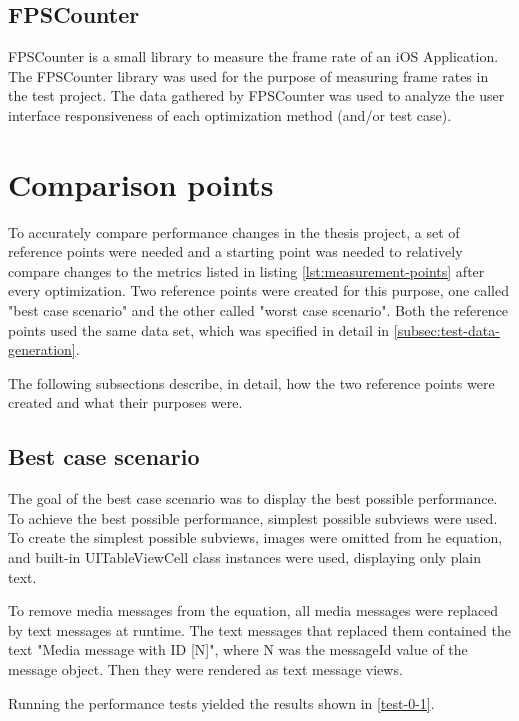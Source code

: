 \documentclass[a4paper,12pt]{article}
\begin{document}
\subsection{FPSCounter}
FPSCounter is a small library to measure the frame rate of an iOS Application.\cite{FPSCounterGithub} The FPSCounter library was used for the purpose of measuring frame rates in the test project. The data gathered by FPSCounter was used to analyze the user interface responsiveness of each optimization method (and/or test case).

\section{Comparison points}
To accurately compare performance changes in the thesis project, a set of reference points were needed and a starting point was needed to relatively compare changes to the metrics listed in listing \autoref{lst:measurement-points} after every optimization. Two reference points were created for this purpose, one called "best case scenario" and the other called "worst case scenario". Both the reference points used the same data set, which was specified in detail in \autoref{subsec:test-data-generation}. 

The following subsections describe, in detail, how the two reference points were created and what their purposes were.

\subsection{Best case scenario}
\label{subsec:best-case-scenario}
The goal of the best case scenario was to display the best possible performance. To achieve the best possible performance, simplest possible subviews were used. To create the simplest possible subviews, images were omitted from he equation, and built-in UITableViewCell class instances were used, displaying only plain text.

To remove media messages from the equation, all media messages were replaced by text messages at runtime. The text messages that replaced them contained the text "Media message with ID [N]", where N was the messageId value of the message object. Then they were rendered as text message views.

Running the performance tests yielded the results shown in \autoref{test-0-1}.
\end{document}
